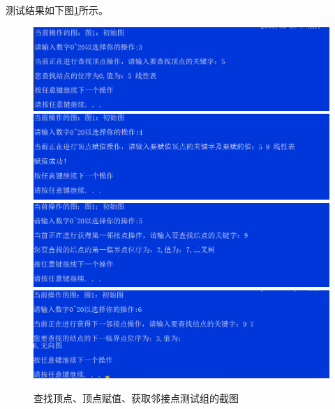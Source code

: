 \documentclass[supercite]{Experimental_Report}
\theoremstyle{definition}
\begin{document}
\begin{enumerate}
	测试结果如下图\ref{fig2-7}所示。
	\begin{figure}[htb] %
		\begin{center}
			\includegraphics[scale=0.6]{./images/图/1-3.png}
			\includegraphics[scale=0.6]{./images/图/1-4.png}
			\includegraphics[scale=0.6]{./images/图/1-5.png}
			\includegraphics[scale=0.6]{./images/图/1-6.png}
			\caption{查找顶点、顶点赋值、获取邻接点测试组的截图}
			\label{fig2-7}
		\end{center}
	\end{figure}


\end{enumerate}
\end{document}
